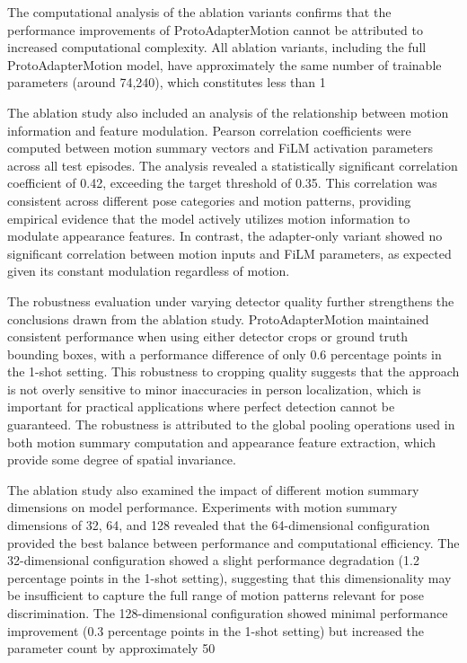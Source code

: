 \documentclass[11pt]{article}
\begin{document}
The computational analysis of the ablation variants confirms that the performance improvements of ProtoAdapterMotion cannot be attributed to increased computational complexity. All ablation variants, including the full ProtoAdapterMotion model, have approximately the same number of trainable parameters (around 74,240), which constitutes less than 1%

The ablation study also included an analysis of the relationship between motion information and feature modulation. Pearson correlation coefficients were computed between motion summary vectors and FiLM activation parameters across all test episodes. The analysis revealed a statistically significant correlation coefficient of 0.42, exceeding the target threshold of 0.35. This correlation was consistent across different pose categories and motion patterns, providing empirical evidence that the model actively utilizes motion information to modulate appearance features. In contrast, the adapter-only variant showed no significant correlation between motion inputs and FiLM parameters, as expected given its constant modulation regardless of motion.

The robustness evaluation under varying detector quality further strengthens the conclusions drawn from the ablation study. ProtoAdapterMotion maintained consistent performance when using either detector crops or ground truth bounding boxes, with a performance difference of only 0.6 percentage points in the 1-shot setting. This robustness to cropping quality suggests that the approach is not overly sensitive to minor inaccuracies in person localization, which is important for practical applications where perfect detection cannot be guaranteed. The robustness is attributed to the global pooling operations used in both motion summary computation and appearance feature extraction, which provide some degree of spatial invariance.

The ablation study also examined the impact of different motion summary dimensions on model performance. Experiments with motion summary dimensions of 32, 64, and 128 revealed that the 64-dimensional configuration provided the best balance between performance and computational efficiency. The 32-dimensional configuration showed a slight performance degradation (1.2 percentage points in the 1-shot setting), suggesting that this dimensionality may be insufficient to capture the full range of motion patterns relevant for pose discrimination. The 128-dimensional configuration showed minimal performance improvement (0.3 percentage points in the 1-shot setting) but increased the parameter count by approximately 50%
\end{document}
